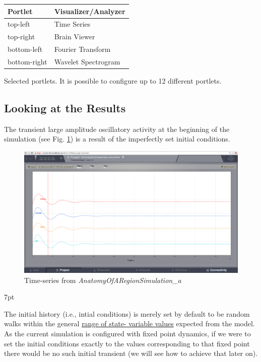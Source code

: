 \documentclass{tufte-handout}
\newenvironment{blah}{%
  \def\FrameCommand{%
    \hspace{1pt}%
    {\color{DarkOrange}\vrule width 2pt}%
    {\color{PeachPuff}\vrule width 4pt}%
    \colorbox{PeachPuff}%
  }%
  \MakeFramed{\advance\hsize-\width\FrameRestore}%
  \noindent\hspace{-4.55pt}%
  \begin{adjustwidth}{}{7pt}%
  \vspace{2pt}\vspace{2pt}%
}
{%
  \vspace{2pt}\end{adjustwidth}\endMakeFramed%
}
\begin{document}
\begin{margintable}
  \centering
  \selectfont
  \begin{tabular}{ll}
    \toprule
    Portlet & Visualizer/Analyzer \\
    \midrule
             top-left          &   Time Series   \\
             top-right        &   Brain Viewer\\
             bottom-left    &   Fourier Transform        \\
             bottom-right  &   Wavelet Spectrogram \\
    \bottomrule
  \end{tabular}
  \caption{Selected portlets. It is possible to configure up to 12 different portlets. }
  \label{tab:portletstab}
\end{margintable}


\subsection{Looking at the Results}\label{sec:results}

The transient large amplitude oscillatory activity at the beginning of the
simulation (see Fig. \ref{fig:time_series}) is a result of the imperfectly set initial conditions.

\begin{figure}[h]
  \includegraphics[width=\linewidth]{Handout_UI_BuildingYourOwnBrainNetworkModel_AnimatedTimeSeries}%
  \caption{Time-series from \textit{AnatomyOfARegionSimulation\_a}}%
  \label{fig:time_series}%
\end{figure}
 
\begin{blah}
The initial history (i.e., intial conditions) is
merely set by default to be random walks within the general \underline{range of state-
variable values} expected from the model. 
As the current simulation is
configured with fixed point dynamics, if we were to set the initial conditions
exactly to the values corresponding to that fixed point there would be no such
initial transient (we will see how to achieve that later on).
\end{blah}
\end{document}

